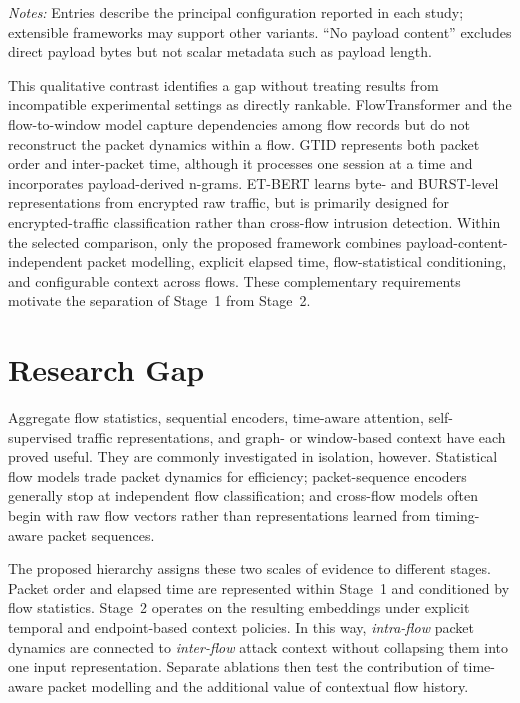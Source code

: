 \documentclass[11pt,fleqn]{report}
\begin{document}
\begin{table}[H]
\begin{minipage}{\textwidth}
\vspace{2pt}
\footnotesize
\emph{Notes:} Entries describe the principal configuration reported in each study; extensible frameworks may support other variants. ``No payload content'' excludes direct payload bytes but not scalar metadata such as payload length.
\end{minipage}
\end{table}

This qualitative contrast identifies a gap without treating results from incompatible experimental settings as directly rankable. FlowTransformer and the flow-to-window model capture dependencies among flow records but do not reconstruct the packet dynamics within a flow. GTID represents both packet order and inter-packet time, although it processes one session at a time and incorporates payload-derived n-grams. ET-BERT learns byte- and BURST-level representations from encrypted raw traffic, but is primarily designed for encrypted-traffic classification rather than cross-flow intrusion detection. Within the selected comparison, only the proposed framework combines payload-content-independent packet modelling, explicit elapsed time, flow-statistical conditioning, and configurable context across flows. These complementary requirements motivate the separation of Stage~1 from Stage~2.
\section{Research Gap}
\label{subsec:rw_gap}

Aggregate flow statistics, sequential encoders, time-aware attention, self-supervised traffic representations, and graph- or window-based context have each proved useful. They are commonly investigated in isolation, however. Statistical flow models trade packet dynamics for efficiency; packet-sequence encoders generally stop at independent flow classification; and cross-flow models often begin with raw flow vectors rather than representations learned from timing-aware packet sequences.

The proposed hierarchy assigns these two scales of evidence to different stages. Packet order and elapsed time are represented within Stage~1 and conditioned by flow statistics. Stage~2 operates on the resulting embeddings under explicit temporal and endpoint-based context policies. In this way, \emph{intra-flow} packet dynamics are connected to \emph{inter-flow} attack context without collapsing them into one input representation. Separate ablations then test the contribution of time-aware packet modelling and the additional value of contextual flow history.
\end{document}
